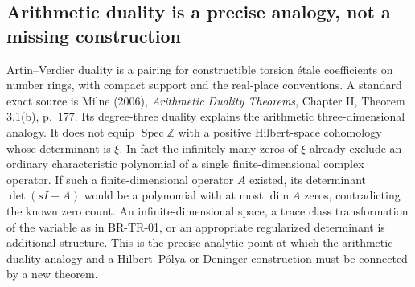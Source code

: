 \subsection{Arithmetic duality is a precise analogy, not a missing construction}

Artin--Verdier duality is a pairing for constructible torsion
\'etale coefficients on number rings, with compact support and
the real-place conventions.  A standard exact source is Milne
(2006), \emph{Arithmetic Duality Theorems}, Chapter II,
Theorem 3.1(b), p.~177.  Its degree-three duality explains the arithmetic
three-dimensional analogy.  It does not equip
$\operatorname{Spec}\mathbb Z$ with a positive Hilbert-space
cohomology whose determinant is $\xi$.  In fact the infinitely
many zeros of $\xi$ already exclude an ordinary characteristic
polynomial of a single finite-dimensional complex operator.
If such a finite-dimensional operator $A$ existed, its
determinant $\det(sI-A)$ would be a polynomial with at most
$\dim A$ zeros, contradicting the known zero count.
An infinite-dimensional space, a trace class transformation
of the variable as in BR-TR-01, or an appropriate regularized
determinant is additional structure.  This is the precise
analytic point at which the arithmetic-duality analogy and a
Hilbert--P\'olya or Deninger construction must be connected by
a new theorem.

